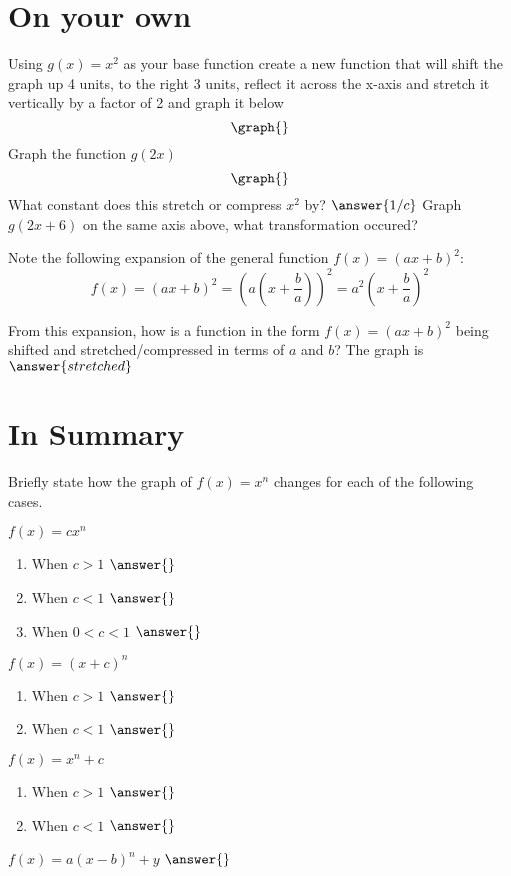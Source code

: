 \documentclass{ximera}
\begin{document}
\section{On your own}
\begin{question}
Using $g(x) = x^2$ as your base function create a new function that will shift the graph up 4 units, to the right 3 units, reflect it across the x-axis and stretch it vertically by a factor of 2 and graph it below
\[
\graph{}
\]
Graph the function $g(2x)$
\[
\graph{}
\]
What constant does this stretch or compress $x^2$ by?
$\answer{1/c}$
Graph $g(2x+6)$ on the same axis above, what transformation occured? 
\begin{freeResponse}
\end{freeResponse}
Note the following expansion of the general function $f(x)=(ax+b)^2$: $$\displaystyle f(x)=\left(ax+b\right)^2=\left(a\left(x+\frac{b}{a}\right)\right)^2=a^2\left(x+\frac{b}{a}\right)^2$$

From this expansion, how is a function in the form $f(x)=(ax+b)^2$ being shifted and stretched/compressed in terms of $a$ and $b$?
The graph is $\answer{stretched}$ 
\end{question}
\section{In Summary}
Briefly state how the graph of $f(x)=x^n$ changes for each of the following cases.
\begin{question}
$f(x)=cx^n$
\begin{enumerate}
\item When $c>1$ $\answer{}$
\item When $c<1$ $\answer{}$
\item When $0<c<1$ $\answer{}$
\end{enumerate}
$f(x)=(x+c)^n$
\begin{enumerate}
\item When $c>1$ $\answer{}$
\item When $c<1$ $\answer{}$
\end{enumerate}
$f(x)=x^n+c$
\begin{enumerate}
\item When $c>1$ $\answer{}$
\item When $c<1$ $\answer{}$
\end{enumerate}
$f(x)=a(x-b)^n+y$ $\answer{}$
\end{question}
\end{document}

